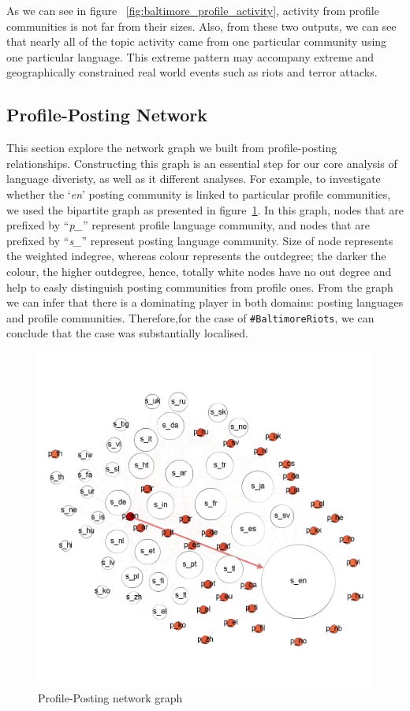 As we can see in figure ~\ref{fig:baltimore_profile_activity}, 
activity from profile communities is not far from their sizes.
Also, from these two outputs, we can see that nearly all of the topic
activity came from one particular community using one particular
language. This extreme pattern may accompany extreme and
geographically constrained real world events such as riots and terror
attacks.

\subsection{Profile-Posting Network}

This section explore the network graph we built from profile-posting relationships.
Constructing this graph is an essential step for our core analysis of language 
diveristy, as well as it different analyses. For example, to investigate whether 
the `{\emph{en}}' posting community is linked to particular profile communities, 
we used the bipartite graph as presented in figure~\ref{fig:baltimore_p_s_lang_sl}. 
In this graph, nodes that are prefixed by ``{\emph{p\_}}'' represent profile language 
community, and nodes that are prefixed by ``{\emph{s\_}}'' represent posting language
community. Size of node represents the weighted indegree, whereas colour
represents the outdegree; the darker the colour, the higher
outdegree, hence, totally white nodes have no out degree and help to easly 
distinguish posting communities from profile ones. From the graph 
we can infer that there is a dominating player in both domains: posting languages and profile communities.
Therefore,for the case of {\texttt{\#BaltimoreRiots}}, we can conclude that the case was
substantially localised.

\begin{figure}[htb]
\centering
\includegraphics[width=\columnwidth]{images/baltimore_p_s_lang_sl.png}
\caption{Profile-Posting network graph}
\label{fig:baltimore_p_s_lang_sl}
\end{figure}


